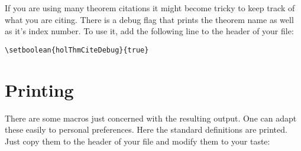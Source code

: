 \documentclass{scrartcl}
\begin{document}
If you are using many theorem citations it might become tricky to keep track of what you are citing.
There is a debug flag that prints the theorem name as well as it's index number. To use it, add the following
line to the header of your file:
\begin{verbatim}
\setboolean{holThmCiteDebug}{true}
\end{verbatim}


\section{Printing}
There are some macros just concerned with the resulting output.
One can adapt these easily to personal preferences. Here the standard
definitions are printed. Just copy them to the header of your file
and modify them to your taste:
\end{document}
